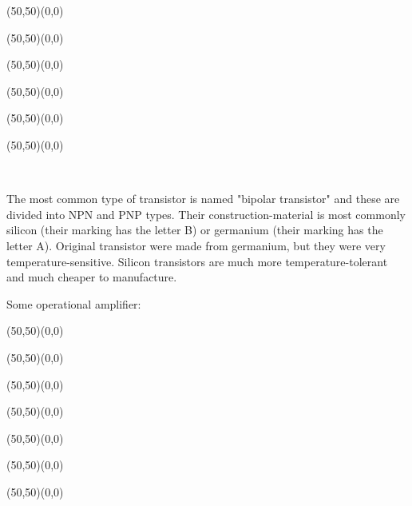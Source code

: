 	
	\pagebreak
	\vspace{1cm}
	\begin{center}
	\begin{picture}(50,50)(0,0)
	\end{picture}
	\begin{picture}(50,50)(0,0)
	\end{picture}
	\begin{picture}(50,50)(0,0)
	\end{picture}
	\begin{picture}(50,50)(0,0)
	\end{picture}
	\begin{picture}(50,50)(0,0)
	\end{picture}
	\begin{picture}(50,50)(0,0)
	\end{picture}\\[2cm]
	\end{center}
	The most common type of transistor is named "bipolar transistor" and these are divided into NPN and PNP types.
Their construction-material is most commonly silicon (their marking has the letter B) or germanium (their marking has the letter A). Original transistor were made from germanium, but they were very temperature-sensitive. Silicon transistors are much more temperature-tolerant and much cheaper to manufacture.

	Some operational amplifier: 
	\vspace{1cm}
	\begin{center}
	\begin{picture}(50,50)(0,0)
	\end{picture}
	\begin{picture}(50,50)(0,0)
	\end{picture}
	\begin{picture}(50,50)(0,0)
	\end{picture}
	\begin{picture}(50,50)(0,0)
	\end{picture}
	\begin{picture}(50,50)(0,0)
	\end{picture}
	\begin{picture}(50,50)(0,0)
	\end{picture}
	\begin{picture}(50,50)(0,0)
	\end{picture}\\[2cm]
	\end{center}
	
